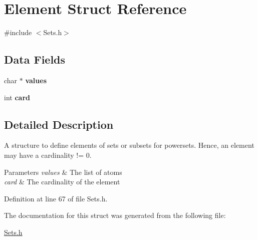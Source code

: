 \hypertarget{struct_element}{
\section{Element Struct Reference}
\label{struct_element}
}


{\ttfamily \#include $<$Sets.h$>$}

\subsection*{Data Fields}
\begin{DoxyCompactItemize}
\item 
\hypertarget{struct_element_ae0a6707762d7508ab3f46a732a4dd8ac}{
char $\ast$ {\bfseries values}}
\label{struct_element_ae0a6707762d7508ab3f46a732a4dd8ac}

\item 
\hypertarget{struct_element_acd789e381a684163a021e2d228653afd}{
int {\bfseries card}}
\label{struct_element_acd789e381a684163a021e2d228653afd}

\end{DoxyCompactItemize}


\subsection{Detailed Description}
A structure to define elements of sets or subsets for powersets. Hence, an element may have a cardinality != 0. 
\begin{DoxyParams}{Parameters}
{\em values} & The list of atoms \\
\hline
{\em card} & The cardinality of the element \\
\hline
\end{DoxyParams}


Definition at line 67 of file Sets.h.



The documentation for this struct was generated from the following file:\begin{DoxyCompactItemize}
\item 
\hyperlink{_sets_8h}{Sets.h}\end{DoxyCompactItemize}
